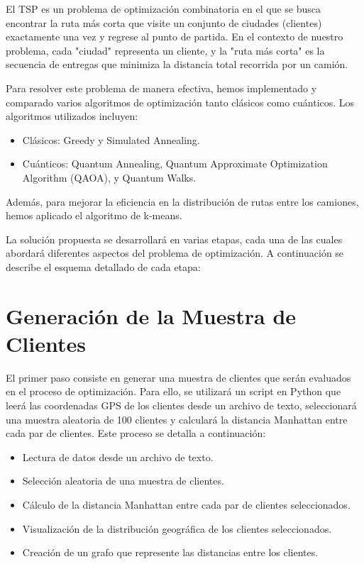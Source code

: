 \documentclass[11pt,a4paper,spanish]{book}
\begin{document}
El TSP es un problema de optimización combinatoria en el que se busca encontrar la ruta más corta que visite un conjunto de ciudades (clientes) exactamente una vez y regrese al punto de partida. En el contexto de nuestro problema, cada "ciudad" representa un cliente, y la "ruta más corta" es la secuencia de entregas que minimiza la distancia total recorrida por un camión.

Para resolver este problema de manera efectiva, hemos implementado y comparado varios algoritmos de optimización tanto clásicos como cuánticos. Los algoritmos utilizados incluyen:

\begin{itemize}
    \item Clásicos: Greedy y Simulated Annealing.
    \item Cuánticos: Quantum Annealing, Quantum Approximate Optimization Algorithm (QAOA), y Quantum Walks.
\end{itemize}

Además, para mejorar la eficiencia en la distribución de rutas entre los camiones, hemos aplicado el algoritmo de k-means.


La solución propuesta se desarrollará en varias etapas, cada una de las cuales abordará diferentes aspectos del problema de optimización. A continuación se describe el esquema detallado de cada etapa:




\section{Generación de la Muestra de Clientes}

El primer paso consiste en generar una muestra de clientes que serán evaluados en el proceso de optimización. Para ello, se utilizará un script en Python que leerá las coordenadas GPS de los clientes desde un archivo de texto, seleccionará una muestra aleatoria de 100 clientes y calculará la distancia Manhattan entre cada par de clientes. Este proceso se detalla a continuación:

\begin{itemize}
    \item Lectura de datos desde un archivo de texto.
    \item Selección aleatoria de una muestra de clientes.
    \item Cálculo de la distancia Manhattan entre cada par de clientes seleccionados.
    \item Visualización de la distribución geográfica de los clientes seleccionados.
    \item Creación de un grafo que represente las distancias entre los clientes.
\end{itemize}
\end{document}

